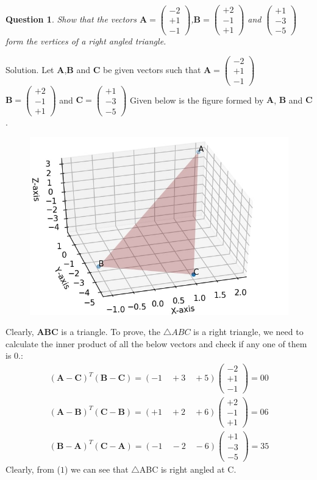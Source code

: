 \documentclass{article}
\newtheorem{question}[theorem]{Question}
\newcommand{\vect}[1]{\boldsymbol{\mathbf{#1}}}
\newcommand{\myvec}[1]{\ensuremath{\begin{pmatrix}#1\end{pmatrix}}}
\begin{document}
\begin{question}
	Show that the vectors $\vect{A}=\myvec{-2 \\ +1 \\ -1}$,$\vect{B}=\myvec{+2 \\ -1 \\ +1}$ and $\myvec{+1\\-3\\-5}$
form the vertices of a right angled triangle.
\end{question}
Solution. Let $\vect{A}$,$\vect{B}$  and $\vect{C}$ be given vectors such that $\vect{A} = \myvec{-2 \\ +1 \\ -1}$ \\
$\vect{B}=\myvec{+2 \\ -1 \\ +1}$ and $\vect{C}= \myvec{+1\\-3\\-5}$
Given below is the figure formed by $\vect{A}$, $\vect{B}$ and $\vect{C}$.

\begin{figure}[!htb]
	
	\centering
	
	\includegraphics[width=\columnwidth]{assignment1fig-1.jpg}
	
	\caption{\label{fig1}}
	
	\label{fig:}
	
\end{figure}
Clearly, $\vect{A}\vect{B}\vect{C}$ is a triangle.
To prove, the $\triangle ABC$ is a right triangle, we need to calculate the inner product of all the below vectors and check if any one of them is 0.:
\begin{align}
	(\vect{A} -\vect{C})^T (\vect{B}-\vect{C}) = (-1 \quad+3 \quad +5) \myvec{-2 \\ +1 \\ -1}  = 00 \\
	(\vect{A} -\vect{B})^T (\vect{C}-\vect{B})
	 = (+1 \quad +2 \quad +6) \myvec{+2 \\ -1 \\ +1} = 06 \\
    (\vect{B} -\vect{A})^T (\vect{C}-\vect{A}) = (-1\quad-2 \quad-6) \myvec{+1\\-3\\-5} = 35 
\end{align}
Clearly, from ($1$) we can see that $\triangle$ABC is right angled at C.
\end{document}
